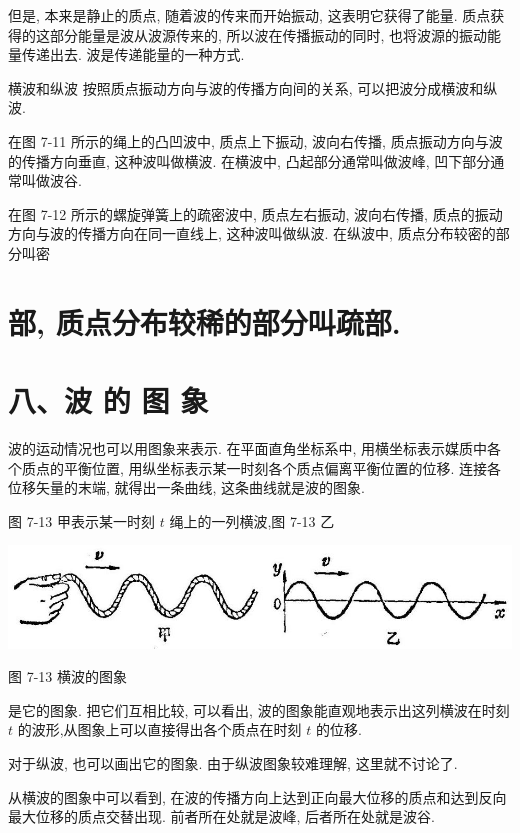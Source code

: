 \documentclass[10pt]{article}
\begin{document}
但是, 本来是静止的质点, 随着波的传来而开始振动, 这表明它获得了能量. 质点获得的这部分能量是波从波源传来的, 所以波在传播振动的同时, 也将波源的振动能量传递出去. 波是传递能量的一种方式.

横波和纵波 按照质点振动方向与波的传播方向间的关系, 可以把波分成横波和纵波.

在图 7-11 所示的绳上的凸凹波中, 质点上下振动, 波向右传播, 质点振动方向与波的传播方向垂直, 这种波叫做横波. 在横波中, 凸起部分通常叫做波峰, 凹下部分通常叫做波谷.

在图 7-12 所示的螺旋弹簧上的疏密波中, 质点左右振动, 波向右传播, 质点的振动方向与波的传播方向在同一直线上, 这种波叫做纵波. 在纵波中, 质点分布较密的部分叫密

\section*{部, 质点分布较稀的部分叫疏部.}

\section*{八、波 的 图 象}

波的运动情况也可以用图象来表示. 在平面直角坐标系中, 用横坐标表示媒质中各个质点的平衡位置, 用纵坐标表示某一时刻各个质点偏离平衡位置的位移. 连接各位移矢量的末端, 就得出一条曲线, 这条曲线就是波的图象.

图 7-13 甲表示某一时刻 \(t\) 绳上的一列横波,图 7-13 乙

\begin{center}
\includegraphics[max width=1.0\textwidth]{images/01912d55-147c-70aa-b0e0-1782a122f948_208_456762.jpg}
\end{center}

图 7-13 横波的图象

是它的图象. 把它们互相比较, 可以看出, 波的图象能直观地表示出这列横波在时刻 \(t\) 的波形,从图象上可以直接得出各个质点在时刻 \(t\) 的位移.

对于纵波, 也可以画出它的图象. 由于纵波图象较难理解, 这里就不讨论了.

从横波的图象中可以看到, 在波的传播方向上达到正向最大位移的质点和达到反向最大位移的质点交替出现. 前者所在处就是波峰, 后者所在处就是波谷.
\end{document}
